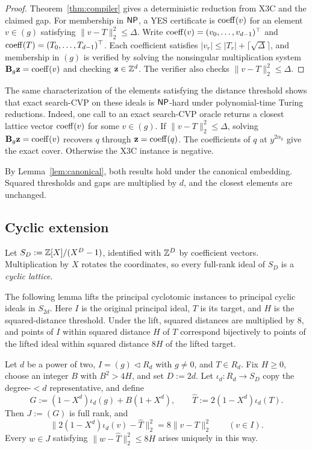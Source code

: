 \begin{proof}
Theorem~\ref{thm:compiler} gives a deterministic reduction from X3C and the
claimed gap.  For membership in \(\mathsf{NP}\), a YES certificate is
\(\operatorname{coeff}(v)\) for an element \(v\in(g)\) satisfying
\(\|v-T\|_2^2\leq\Delta\).  Write
\(\operatorname{coeff}(v)=(v_0,\ldots,v_{d-1})^\top\) and
\(\operatorname{coeff}(T)=(T_0,\ldots,T_{d-1})^\top\).  Each coefficient satisfies
\(|v_r|\leq|T_r|+\lceil\sqrt\Delta\rceil\), and membership in \((g)\) is
verified by solving the nonsingular multiplication system
\(\mathbf B_g\mathbf z=\operatorname{coeff}(v)\) and checking
\(\mathbf z\in\mathbb Z^d\).
The verifier also checks \(\|v-T\|_2^2\leq\Delta\).

\end{proof}

The same characterization of the elements satisfying the
distance threshold shows that exact search-CVP on these ideals is
\(\mathsf{NP}\)-hard under polynomial-time Turing reductions.
Indeed, one call to an exact search-CVP oracle returns a closest lattice vector
\(\operatorname{coeff}(v)\) for some \(v\in(g)\).
If \(\|v-T\|_2^2\leq\Delta\), solving
\(\mathbf B_g\mathbf z=\operatorname{coeff}(v)\) recovers \(q\) through
\(\mathbf z=\operatorname{coeff}(q)\).  The coefficients of \(q\) at
\(y^{2\alpha_k}\) give the exact cover.  Otherwise the X3C instance is
negative.

By Lemma~\ref{lem:canonical}, both results hold under the
canonical embedding.  Squared thresholds and gaps are multiplied by \(d\),
and the closest elements are unchanged.

\subsection{Cyclic extension}
\label{sec:cyclic-cvp}

Let \(S_D:=\mathbb Z[X]/(X^D-1)\), identified with \(\mathbb Z^D\) by coefficient vectors.
Multiplication by \(X\) rotates the coordinates, so every full-rank ideal of
\(S_D\) is a \emph{cyclic lattice}.

The following lemma lifts the principal cyclotomic instances to
principal cyclic ideals in \(S_{2d}\).
Here \(I\) is the
original principal ideal, \(T\) is its target, and \(H\) is the
squared-distance threshold. Under the lift, squared distances
are multiplied by \(8\), and points of \(I\) within squared distance \(H\)
of \(T\) correspond bijectively to points of the lifted ideal within
squared distance \(8H\) of the lifted target.

\begin{lemma}
\label{lem:principal-crt}
Let \(d\) be a power of two, \(I=(g)\lhd R_d\) with \(g\neq0\), and
\(T\in R_d\).  Fix \(H\geq0\), choose an integer \(B\) with \(B^2>4H\),
and set \(D:=2d\).  Let \(\iota_d:R_d\to S_D\) copy the
degree-\(<d\) representative, and define
\[
 G:=(1-X^d)\iota_d(g)+B(1+X^d),
 \qquad
 \widehat T:=2(1-X^d)\iota_d(T).
\]
Then \(J:=(G)\) is full rank, and
\[
 \|2(1-X^d)\iota_d(v)-\widehat T\|_2^2
 =8\|v-T\|_2^2
 \qquad(v\in I).
\]
Every \(w\in J\) satisfying
\(\|w-\widehat T\|_2^2\leq8H\) arises uniquely in this way.
\end{lemma}

